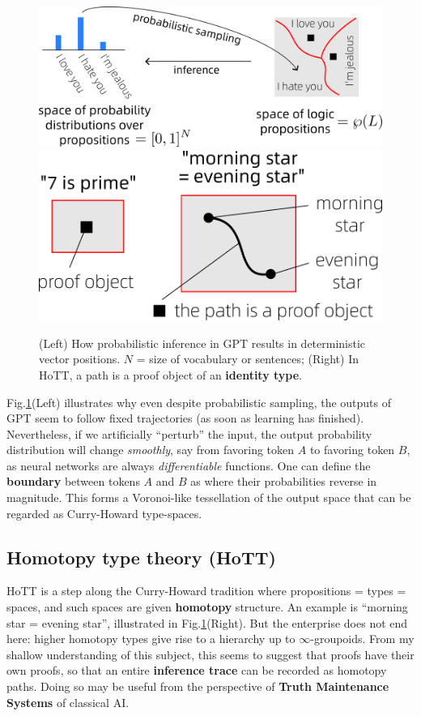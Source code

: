 \documentclass[runningheads]{llncs}
\begin{document}
\begin{figure}
	\includegraphics[scale=.45]{Transformer-output.png} \quad
	\includegraphics[scale=.35]{morning-star.png}
	\caption{(Left) How probabilistic inference in GPT results in deterministic vector positions. $N$ = size of vocabulary or sentences; (Right) In HoTT, a path is a proof object of an \textbf{identity type}.}
	\label{fig:morning-star}
\end{figure}

Fig.\ref{fig:morning-star}(Left) illustrates why even despite probabilistic sampling, the outputs of GPT seem to follow fixed trajectories (as soon as learning has finished).  Nevertheless, if we artificially ``perturb'' the input, the output probability distribution will change \textit{smoothly}, say from favoring token $A$ to favoring token $B$, as neural networks are always \textit{differentiable} functions.  One can define the \textbf{boundary} between tokens $A$ and $B$ as where their probabilities reverse in magnitude.  This forms a Voronoi-like tessellation of the output space that can be regarded as Curry-Howard type-spaces.

\subsection{Homotopy type theory (HoTT)}

HoTT is a step along the Curry-Howard tradition where propositions = types = spaces, and such spaces are given \textbf{homotopy} structure.  An example is ``morning star = evening star'', illustrated in Fig.\ref{fig:morning-star}(Right).  But the enterprise does not end here: higher homotopy types give rise to a hierarchy up to $\infty$-groupoids.  From my shallow understanding of this subject, this seems to suggest that proofs have their own proofs, so that an entire \textbf{inference trace} can be recorded as homotopy paths.  Doing so may be useful from the perspective of \textbf{Truth Maintenance Systems} of classical AI.
\end{document}
